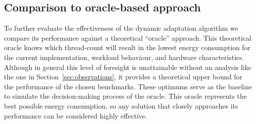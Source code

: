 \subsection{Comparison to oracle-based approach}\label{sec:evalation-oracle}
To further evaluate the effectiveness of the dynamic adaptation algorithm we compare its performance
against a theoretical ``oracle'' approach. This theoretical oracle knows which thread-count will
result in the lowest energy consumption for the current implementation, workload behaviour, and
hardware characteristics. Although in general this level of foresight is unattainable without an
analysis like the one in Section~\ref{sec:observations}, it provides a theoretical upper bound for
the performance of the chosen benchmarks. These optimums serve as the baseline to simulate the
decision-making process of the oracle. This oracle represents the best possible energy consumption,
so any solution that closely approaches its performance can be considered highly effective.

